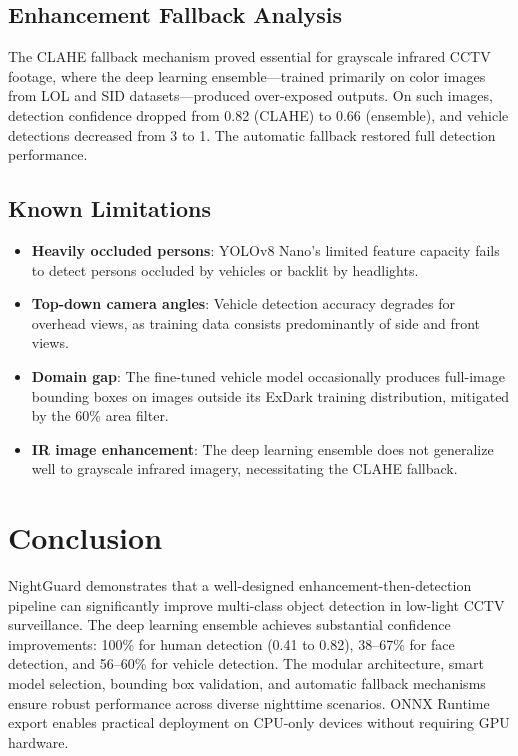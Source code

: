\documentclass[conference]{IEEEtran}
\begin{document}
\subsection{Enhancement Fallback Analysis}

The CLAHE fallback mechanism proved essential for grayscale infrared CCTV footage, where the deep learning ensemble---trained primarily on color images from LOL and SID datasets---produced over-exposed outputs. On such images, detection confidence dropped from 0.82 (CLAHE) to 0.66 (ensemble), and vehicle detections decreased from 3 to 1. The automatic fallback restored full detection performance.

\subsection{Known Limitations}

\begin{itemize}
\item \textbf{Heavily occluded persons}: YOLOv8 Nano's limited feature capacity fails to detect persons occluded by vehicles or backlit by headlights.
\item \textbf{Top-down camera angles}: Vehicle detection accuracy degrades for overhead views, as training data consists predominantly of side and front views.
\item \textbf{Domain gap}: The fine-tuned vehicle model occasionally produces full-image bounding boxes on images outside its ExDark training distribution, mitigated by the 60\% area filter.
\item \textbf{IR image enhancement}: The deep learning ensemble does not generalize well to grayscale infrared imagery, necessitating the CLAHE fallback.
\end{itemize}

\section{Conclusion}

NightGuard demonstrates that a well-designed enhancement-then-detection pipeline can significantly improve multi-class object detection in low-light CCTV surveillance. The deep learning ensemble achieves substantial confidence improvements: 100\% for human detection (0.41 to 0.82), 38--67\% for face detection, and 56--60\% for vehicle detection. The modular architecture, smart model selection, bounding box validation, and automatic fallback mechanisms ensure robust performance across diverse nighttime scenarios. ONNX Runtime export enables practical deployment on CPU-only devices without requiring GPU hardware.
\end{document}
